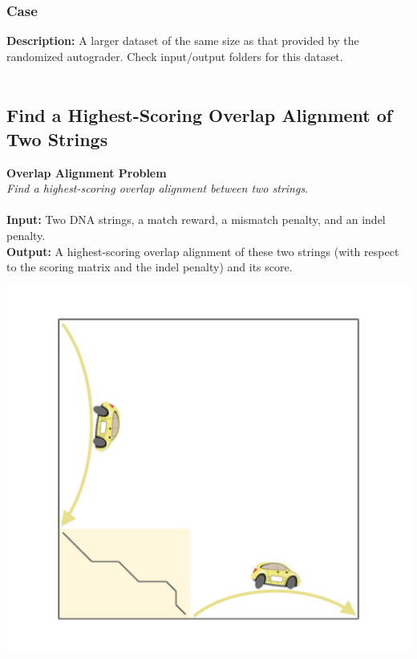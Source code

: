 \documentclass{article}
\begin{document}
\subsubsection*{Case }
\hline \vspace{5}
\textbf{Description:} A larger dataset of the same size as that provided by the randomized autograder. Check input/output folders for this dataset.\\ \\
\pagebreak

\subsection{Find a Highest-Scoring Overlap Alignment of Two Strings}
\hline\vspace{5}
\textbf{Overlap Alignment Problem}\\
\emph{Find a highest-scoring overlap alignment between two strings}.\\ \\
\textbf{Input:} Two DNA strings, a match reward, a mismatch penalty, and an indel penalty.\\
\textbf{Output:} A highest-scoring overlap alignment of these two strings (with respect to the scoring matrix and the indel penalty) and its score.
\begin{center}
    \includegraphics[scale=0.2]{c5/logos/5I.png}
\end{center}
\hline\vspace{5}
\end{document}
